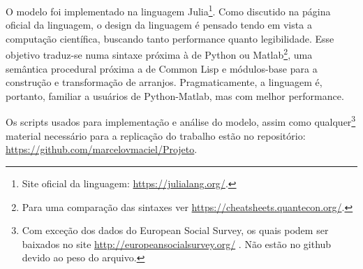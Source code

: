 O modelo foi implementado na linguagem Julia\footnote{Site oficial da linguagem:
\url{https://julialang.org/}.}. Como discutido na página oficial da linguagem, o
design da linguagem é pensado tendo em vista a computação científica, buscando
tanto performance quanto legibilidade. Esse objetivo traduz-se numa sintaxe
próxima à de Python ou Matlab\footnote{Para uma comparação das sintaxes ver
\url{https://cheatsheets.quantecon.org/}.}, uma semântica procedural próxima a
de Common Lisp e módulos-base  para a construção e transformação de
arranjos. Pragmaticamente, a linguagem é, portanto, familiar a usuários de
Python-Matlab, mas com melhor performance.

Os scripts usados para implementação e análise do modelo, assim como
qualquer\footnote{Com exceção dos dados do European Social Survey, os quais
podem ser baixados no site \url{http://europeansocialsurvey.org/} . Não estão no
github devido ao peso do arquivo.} material necessário para a replicação do
trabalho estão no repositório: \url{https://github.com/marcelovmaciel/Projeto}.

% 
